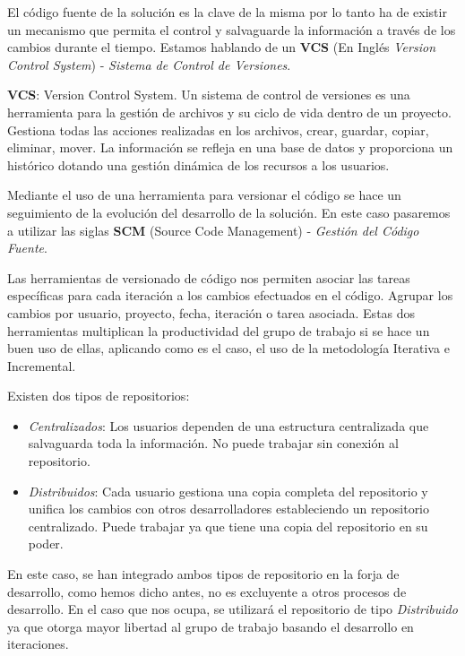\par El código fuente de la solución es la clave de la misma por lo tanto ha de existir un mecanismo que permita el control y salvaguarde la información a través de los cambios durante el tiempo. Estamos hablando de un \textbf{VCS} (En Inglés \emph{Version Control System}) - \emph{Sistema de Control de Versiones}.

\par \textbf{VCS}: Version Control System. Un sistema de control de versiones es una herramienta para la gestión de archivos y su ciclo de vida dentro de un proyecto. Gestiona todas las acciones realizadas en los archivos, crear, guardar, copiar, eliminar, mover. La información se refleja en una base de datos y proporciona un histórico dotando una gestión dinámica de los recursos a los usuarios.

\par Mediante el uso de una herramienta para versionar el código se hace un seguimiento de la evolución del desarrollo de la solución. En este caso pasaremos a utilizar las siglas \textbf{SCM} (Source Code Management) - \emph{Gestión del Código Fuente}.

\par Las herramientas de versionado de código nos permiten asociar las tareas específicas para cada iteración a los cambios efectuados en el código. Agrupar los cambios por usuario, proyecto, fecha, iteración o tarea asociada. Estas dos herramientas multiplican la productividad del grupo de trabajo si se hace un buen uso de ellas, aplicando como es el caso, el uso de la metodología Iterativa e Incremental.

\par Existen dos tipos de repositorios:

\begin{itemize}
	\item \emph{Centralizados}: Los usuarios dependen de una estructura centralizada que salvaguarda toda la información. No puede trabajar sin conexión al repositorio.
	\item \emph{Distribuidos}: Cada usuario gestiona una copia completa del repositorio y unifica los cambios con otros desarrolladores estableciendo un repositorio centralizado. Puede trabajar ya que tiene una copia del repositorio en su poder.
\end{itemize}

\par En este caso, se han integrado ambos tipos de repositorio en la forja de desarrollo, como hemos dicho antes, no es excluyente a otros procesos de desarrollo. En el caso que nos ocupa, se utilizará el repositorio de tipo \emph{Distribuido} ya que otorga mayor libertad al grupo de trabajo basando el desarrollo en iteraciones.


